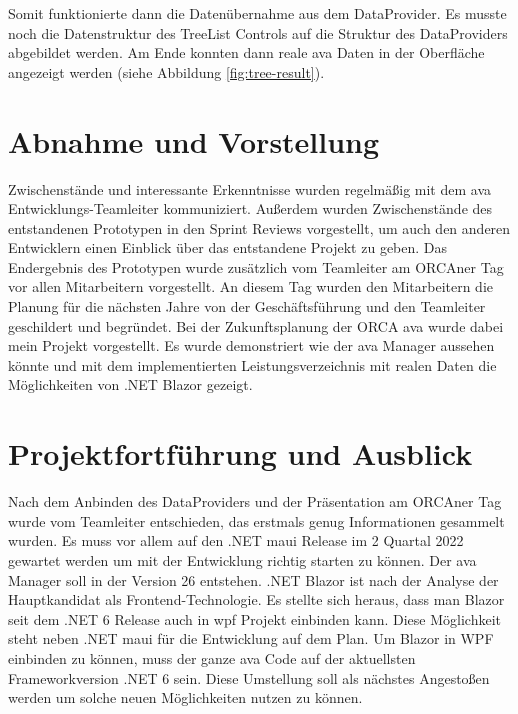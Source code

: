 Somit funktionierte dann die Datenübernahme aus dem DataProvider. Es musste noch die Datenstruktur des TreeList Controls auf die Struktur des DataProviders abgebildet werden. Am Ende konnten dann reale \ac{ava} Daten in der Oberfläche angezeigt werden (siehe Abbildung \ref{fig:tree-result}).

\section{Abnahme und Vorstellung}
Zwischenstände und interessante Erkenntnisse wurden regelmäßig mit dem \ac{ava} Entwicklungs-Teamleiter kommuniziert. Außerdem wurden Zwischenstände des entstandenen Prototypen in den Sprint Reviews vorgestellt, um auch den anderen Entwicklern einen Einblick über das entstandene Projekt zu geben.
Das Endergebnis des Prototypen wurde zusätzlich vom Teamleiter am ORCAner Tag vor allen Mitarbeitern vorgestellt. An diesem Tag wurden den Mitarbeitern die Planung für die nächsten Jahre von der Geschäftsführung und den Teamleiter geschildert und begründet. Bei der Zukunftsplanung der ORCA \ac{ava} wurde dabei mein Projekt vorgestellt. Es wurde demonstriert wie der \ac{ava} Manager aussehen könnte und mit dem implementierten Leistungsverzeichnis mit realen Daten die Möglichkeiten von .NET Blazor gezeigt.

\section{Projektfortführung und Ausblick}
Nach dem Anbinden des DataProviders und der Präsentation am ORCAner Tag wurde vom Teamleiter entschieden, das erstmals genug Informationen gesammelt wurden. Es muss vor allem auf den .NET \ac{maui} Release im 2 Quartal 2022 gewartet werden um mit der Entwicklung richtig starten zu können. Der \ac{ava} Manager soll in der Version 26 entstehen. .NET Blazor ist nach der Analyse der Hauptkandidat als Frontend-Technologie. Es stellte sich heraus, dass man Blazor seit dem .NET 6 Release auch in \ac{wpf} Projekt einbinden kann. Diese Möglichkeit steht neben .NET \ac{maui} für die Entwicklung auf dem Plan. Um Blazor in WPF einbinden zu können, muss der ganze \ac{ava} Code auf der aktuellsten Frameworkversion .NET 6 sein. Diese Umstellung soll als nächstes Angestoßen werden um solche neuen Möglichkeiten nutzen zu können.





